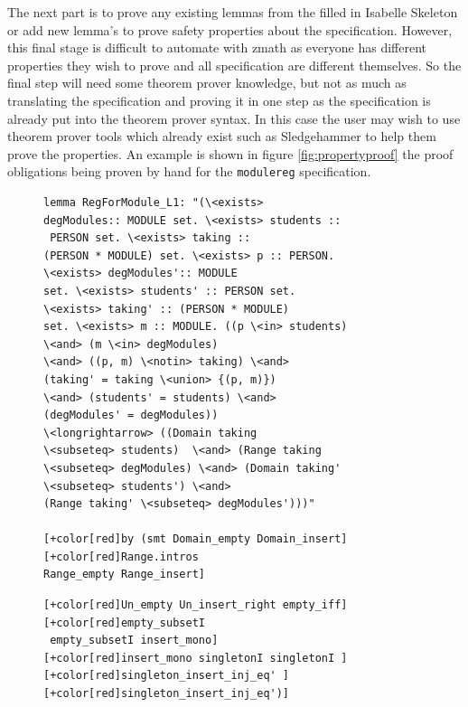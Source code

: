 The next part is to prove any existing lemmas from the filled in Isabelle
Skeleton or add new lemma's to prove safety properties about the specification.
However, this final stage is difficult to automate with \gls{zmath} as everyone
has different properties they wish to prove and all specification are different
themselves. So the final step will need some theorem prover knowledge, but not
as much as translating the specification and proving it in one step as the
specification is already put into the theorem prover syntax. In this case the
user may wish to use theorem prover tools which already exist such as
Sledgehammer \cite{sledgehammer} to help them prove the properties. An example
is shown in figure \ref{fig:propertyproof} the proof obligations being proven by
hand for the \texttt{modulereg} specification.

\begin{figure}[H]
\centering
\begin{minipage}{0.45\textwidth}
\centering
\begin{scriptsize}
 \begin{BVerbatim}[commandchars=+\[\]] 
lemma RegForModule_L1: "(\<exists>
degModules:: MODULE set. \<exists> students ::
 PERSON set. \<exists> taking ::
(PERSON * MODULE) set. \<exists> p :: PERSON. 
\<exists> degModules':: MODULE
set. \<exists> students' :: PERSON set. 
\<exists> taking' :: (PERSON * MODULE)
set. \<exists> m :: MODULE. ((p \<in> students) 
\<and> (m \<in> degModules)
\<and> ((p, m) \<notin> taking) \<and> 
(taking' = taking \<union> {(p, m)})
\<and> (students' = students) \<and> 
(degModules' = degModules))
\<longrightarrow> ((Domain taking 
\<subseteq> students)  \<and> (Range taking
\<subseteq> degModules) \<and> (Domain taking' 
\<subseteq> students') \<and>
(Range taking' \<subseteq> degModules')))"

[+color[red]by (smt Domain_empty Domain_insert] 
[+color[red]Range.intros
Range_empty Range_insert]
\end{BVerbatim}
\end{scriptsize}
\end{minipage}\hfill
\begin{minipage}{0.45\textwidth}
\begin{scriptsize}
\begin{BVerbatim}[commandchars=+\[\]]
[+color[red]Un_empty Un_insert_right empty_iff] 
[+color[red]empty_subsetI 
 empty_subsetI insert_mono]
[+color[red]insert_mono singletonI singletonI ]
[+color[red]singleton_insert_inj_eq' ]
[+color[red]singleton_insert_inj_eq')]


\end{BVerbatim}
\end{scriptsize}
\end{minipage}
\end{figure}
